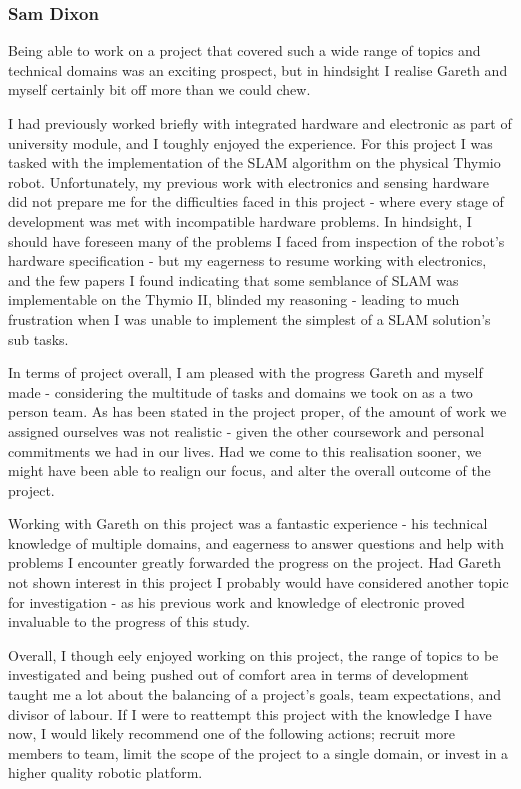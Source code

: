 \subsubsection{Sam Dixon}
Being able to work on a project that covered such a wide range of topics and
technical domains was an exciting prospect, but in hindsight I realise Gareth
and myself certainly bit off more than we could chew.

I had previously worked briefly with integrated hardware and electronic as
part of university module, and I toughly enjoyed the experience.
For this project I was tasked with the implementation of the SLAM algorithm on
the physical Thymio robot.
Unfortunately, my previous work with electronics and sensing hardware did not
prepare me for the difficulties faced in this project - where every stage of
development was met with incompatible hardware problems.
In hindsight, I should have foreseen many of the problems I faced from
inspection of the robot's hardware specification - but my eagerness to resume
working with electronics, and the few papers I found indicating that some
semblance of SLAM was implementable on the Thymio II, blinded my reasoning -
leading to much frustration when I was unable to implement the simplest of
a SLAM solution's sub tasks.

In terms of project overall, I am pleased with the progress Gareth and myself
made - considering the multitude of tasks and domains we took on as a two
person team.
As has been stated in the project proper, of the amount of work we assigned
ourselves was not realistic - given the other coursework and personal
commitments we had in our lives.
Had we come to this realisation sooner, we might have been able to realign our
focus, and alter the overall outcome of the project.

Working with Gareth on this project was a fantastic experience - his technical
knowledge of multiple domains, and eagerness to answer questions and help
with problems I encounter greatly forwarded the progress on the project.
Had Gareth not shown interest in this project I probably would have considered
another topic for investigation - as his previous work and knowledge of
electronic proved invaluable to the progress of this study.

Overall, I though eely enjoyed working on this project, the range of topics to
be investigated and being pushed out of comfort area in terms of development
taught me a lot about the balancing of a project's goals, team expectations,
and divisor of labour.
If I were to reattempt this project with the knowledge I have now, I would
likely recommend one of the following actions; recruit more members to team,
limit the scope of the project to a single domain, or invest in a higher
quality robotic platform.

